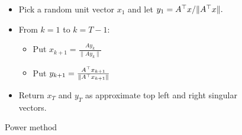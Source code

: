 \begin{figure}[h]
\begin{center}
\begin{boxedminipage}{0.85\textwidth}
\begin{itemize}
\item Pick a random unit vector $x_1$ and let $y_1 = A^\top x/\|A^\top x\|.$
\item From $k=1$ to $k=T-1:$
\begin{itemize}
\item Put $x_{k+1}=\frac{Ay_k}{\|Ay_k\|}$
\item Put $y_{k+1}=\frac{A^\top x_{k+1}}{\|A^\top x_{k+1}\|}$
\end{itemize}
\item Return $x_T$ and $y_T$ 
as approximate top left and right singular vectors.
\end{itemize}
\end{boxedminipage}
\end{center}
\caption{Power method}
\end{figure}




